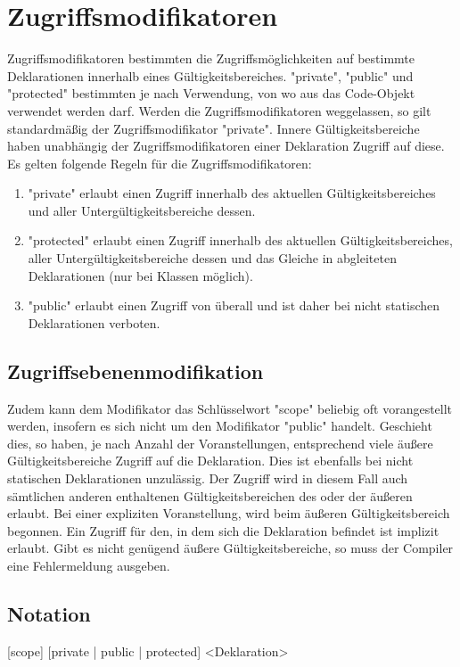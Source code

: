 \chapter{Zugriffsmodifikatoren}
Zugriffsmodifikatoren bestimmten die Zugriffsmöglichkeiten auf bestimmte Deklarationen innerhalb eines Gültigkeitsbereiches.
"private", "public" und "protected" bestimmten je nach Verwendung, von wo aus das Code-Objekt verwendet werden darf.
Werden die Zugriffsmodifikatoren weggelassen, so gilt standardmäßig der Zugriffsmodifikator "private".
Innere Gültigkeitsbereiche haben unabhängig der Zugriffsmodifikatoren einer Deklaration Zugriff auf diese.
Es gelten folgende Regeln für die Zugriffsmodifikatoren:
\begin{enumerate}
     \item "private" erlaubt einen Zugriff innerhalb des aktuellen Gültigkeitsbereiches und aller Untergültigkeitsbereiche dessen.
     \item "protected" erlaubt einen Zugriff innerhalb des aktuellen Gültigkeitsbereiches, aller Untergültigkeitsbereiche dessen und das Gleiche in abgleiteten
Deklarationen (nur bei Klassen möglich).
     \item "public" erlaubt einen Zugriff von überall und ist daher bei nicht statischen Deklarationen verboten.
\end{enumerate}

\section{Zugriffsebenenmodifikation}
Zudem kann dem Modifikator das Schlüsselwort "scope" beliebig oft vorangestellt werden, insofern es sich nicht
um den Modifikator "public" handelt.
Geschieht dies, so haben, je nach Anzahl der Voranstellungen, entsprechend viele äußere Gültigkeitsbereiche
Zugriff auf die Deklaration.
Dies ist ebenfalls bei nicht statischen Deklarationen unzulässig.
Der Zugriff wird in diesem Fall auch sämtlichen anderen enthaltenen Gültigkeitsbereichen des oder der äußeren erlaubt.
Bei einer expliziten Voranstellung, wird beim äußeren Gültigkeitsbereich begonnen. Ein Zugriff für den, in dem sich die
Deklaration befindet ist implizit erlaubt. Gibt es nicht genügend äußere Gültigkeitsbereiche, so muss der Compiler eine
Fehlermeldung ausgeben.

\section{Notation}
[scope] [private | public | protected] <Deklaration>
